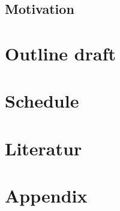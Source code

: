 \documentclass[12pt, a4paper]{article}
\begin{document}
\subsection{Motivation}
\section{Outline draft}
\section{Schedule}
\section{Literatur}
\newpage

\renewcommand{\thesubsection}{\Alph{subsection}}
\setcounter{page}{\value{lastroman}}
\section*{Appendix}
% 
\listoffigures




\end{document}
